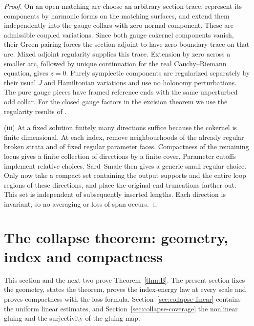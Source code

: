\documentclass[11pt]{amsart}
\theoremstyle{definition}
\theoremstyle{remark}
\theoremstyle{plain}
\numberwithin{equation}{section}
\begin{document}
\begin{proof}
On an open matching arc choose an arbitrary section trace, represent
its components by harmonic forms on the matching surfaces, and
extend them independently into the gauge collars with zero normal
component. These are admissible coupled variations. Since both
gauge cokernel components vanish, their Green pairing forces the
section adjoint to have zero boundary trace on that arc. Mixed
adjoint regularity supplies this trace. Extension by zero across a
smaller arc, followed by unique continuation for the real
Cauchy--Riemann equation, gives $z=0$. Purely symplectic components
are regularized separately by their usual $J$ and Hamiltonian
variations \cite[Theorem~3.9]{WW-relative} and use no holonomy
perturbations. The pure gauge pieces have framed reference ends
with the same unperturbed odd collar. For the closed gauge factors
in the excision theorem we use the regularity results of
\cite[Section~5.3]{KM-unknot}.

(iii) At a fixed solution finitely many directions suffice because the
cokernel is finite dimensional. At each index, remove neighbourhoods
of the already regular broken strata and of fixed regular parameter
faces. Compactness of the remaining locus gives a finite collection
of directions by a finite cover. Parameter cutoffs implement relative
choices. Sard--Smale then gives a generic small regular choice.
Only now take a compact set containing the output supports and the
entire loop regions of these directions, and place the original-end
truncations farther out. This set is independent of subsequently
inserted lengths. Each direction is invariant, so no
averaging or loss of span occurs.
\end{proof}

\section{The collapse theorem: geometry, index and compactness}\label{sec:collapse}

This section and the next two prove Theorem~\ref{thm:B}. The present
section fixes the geometry, states the theorem, proves the index-energy
law at every scale and proves compactness with the loss formula.
Section~\ref{sec:collapse-linear} contains the uniform linear estimates, and Section~\ref{sec:collapse-coverage} the nonlinear gluing and the surjectivity of the gluing map.
\end{document}
